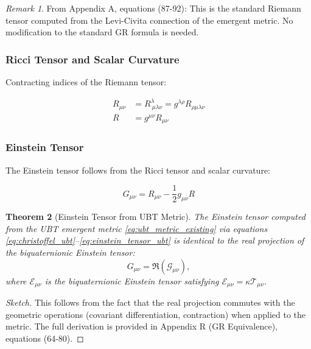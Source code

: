 \documentclass[12pt]{article}
\newtheorem{theorem}{Theorem}[section]
\theoremstyle{definition}
\theoremstyle{remark}
\newtheorem{remark}[theorem]{Remark}
\begin{document}
\begin{remark}
From Appendix A, equations (87-92): This is the standard Riemann tensor computed from the Levi-Civita connection of the emergent metric. No modification to the standard GR formula is needed.
\end{remark}

\subsubsection{Ricci Tensor and Scalar Curvature}

Contracting indices of the Riemann tensor:

\begin{align}
R_{\mu\nu} &= R^\lambda_{\ \mu\lambda\nu} = g^{\lambda\rho}R_{\rho\mu\lambda\nu} \label{eq:ricci_tensor_ubt} \\
R &= g^{\mu\nu}R_{\mu\nu} \label{eq:ricci_scalar_ubt}
\end{align}

\subsubsection{Einstein Tensor}

The Einstein tensor follows from the Ricci tensor and scalar curvature:

\begin{equation}
G_{\mu\nu} = R_{\mu\nu} - \frac{1}{2}g_{\mu\nu}R
\label{eq:einstein_tensor_ubt}
\end{equation}

\begin{theorem}[Einstein Tensor from UBT Metric]
The Einstein tensor computed from the UBT emergent metric \eqref{eq:ubt_metric_existing} via equations \eqref{eq:christoffel_ubt}--\eqref{eq:einstein_tensor_ubt} is identical to the real projection of the biquaternionic Einstein tensor:
\begin{equation}
G_{\mu\nu} = \Re\left(\mathcal{G}_{\mu\nu}\right),
\end{equation}
where $\mathcal{E}_{\mu\nu}$ is the biquaternionic Einstein tensor satisfying $\mathcal{E}_{\mu\nu} = \kappa\mathcal{T}_{\mu\nu}$.
\end{theorem}

\begin{proof}[Sketch]
This follows from the fact that the real projection commutes with the geometric operations (covariant differentiation, contraction) when applied to the metric. The full derivation is provided in Appendix R (GR Equivalence), equations (64-80).
\end{proof}
\end{document}
